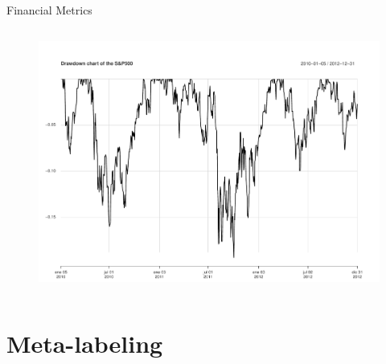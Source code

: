 \documentclass[usenames,dvipsnames]{beamer} %
\begin{document}
\begin{frame}{Financial Metrics}
\begin{columns}
\begin{column}{.5\textwidth}
\begin{figure}
	\includegraphics[scale=.2]{img/drawDownBasic}
\end{figure}
\end{column}
\end{columns}

\end{frame}


\section{Meta-labeling}
\frame{\tableofcontents[currentsection]}
%		
%	
\end{document}
